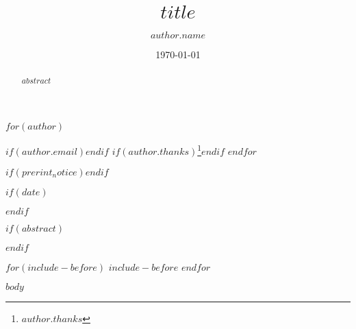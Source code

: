 \documentclass[$for(classoption)$$classoption$$sep$,$endfor$]{JASA}
\begin{document}

\title[$if(shorttitle)$$shorttitle$$endif$]{$title$}



$for(author)$
\author{$author.name$}
$if(author.email)$$endif$
$if(author.thanks)$\thanks{$author.thanks$}$endif$
$endfor$


$if(prerint_notice)$$endif$


$if(date)$\date{\today}$endif$

$if(abstract)$
\begin{abstract}
$abstract$
\end{abstract}
$endif$


\maketitle



$for(include-before)$
$include-before$
$endfor$

$body$

\end{document}
